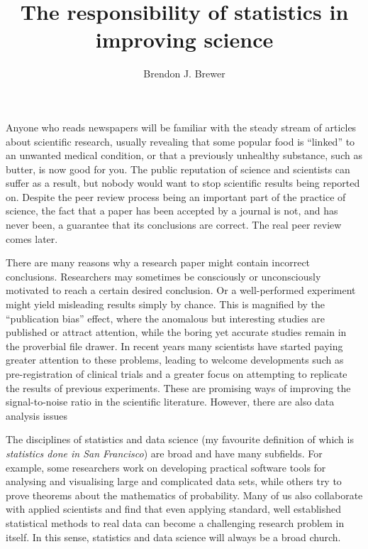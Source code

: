 \documentclass[a4paper, 12pt]{article}
\title{The responsibility of statistics in improving science}
\author{Brendon J. Brewer}
\begin{document}
\sffamily
\maketitle

Anyone who reads newspapers will be familiar with the steady stream of
articles about scientific research, usually revealing that some popular food
is ``linked'' to an unwanted medical condition,
or that a previously unhealthy substance, such as butter, is now
good for you. The public reputation of science and scientists can suffer as
a result, but nobody would want to stop scientific results being reported on.
Despite the peer review process being an important part of the practice of
science, the fact that a paper has been accepted by a journal
is not, and has never been, a guarantee that its conclusions are correct.
The real peer review comes later.

There are many reasons why a research paper might contain incorrect conclusions. Researchers may sometimes be consciously or
unconsciously motivated to reach a certain desired conclusion.
Or a well-performed experiment might yield
misleading results simply by chance. This is magnified by the
``publication bias'' effect, where the anomalous but interesting studies
are published or attract attention, while the boring yet accurate studies
remain in the proverbial file drawer. In recent years many scientists have
started paying greater attention to these problems, leading to welcome
developments such as pre-registration of clinical trials and
a greater focus on attempting to replicate the results of previous
experiments. These are promising ways of improving the signal-to-noise
ratio in the scientific literature.
However, there are also data analysis issues 



The disciplines of statistics and data science
(my favourite definition of which is {\em statistics done in San Francisco})
are broad and have many subfields. For example, some researchers
work on developing practical software tools for analysing and visualising large and
complicated data sets, while others try to prove theorems about the mathematics
of probability. Many of us also collaborate with applied scientists and find
that even applying standard, well established statistical methods to
real data can become a challenging research problem in itself. In this sense,
statistics and data science will always be a broad church.
\end{document}
